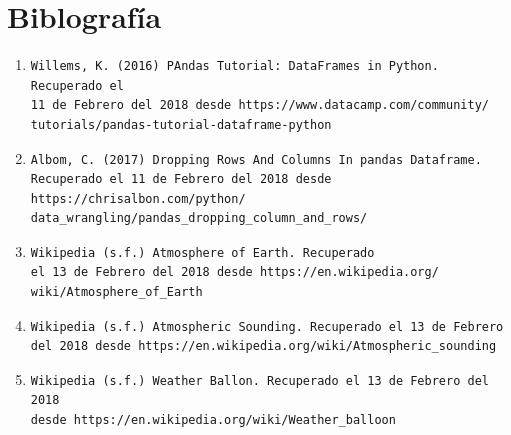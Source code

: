 \documentclass[a4paper]{article}
\begin{document}
\section{Biblografía}
\begin{enumerate}
\item \begin{verbatim}
Willems, K. (2016) PAndas Tutorial: DataFrames in Python. Recuperado el
11 de Febrero del 2018 desde https://www.datacamp.com/community/
tutorials/pandas-tutorial-dataframe-python
\end{verbatim}
\item \begin{verbatim}
Albom, C. (2017) Dropping Rows And Columns In pandas Dataframe. 
Recuperado el 11 de Febrero del 2018 desde https://chrisalbon.com/python/
data_wrangling/pandas_dropping_column_and_rows/
\end{verbatim}
\item \begin{verbatim}
Wikipedia (s.f.) Atmosphere of Earth. Recuperado
el 13 de Febrero del 2018 desde https://en.wikipedia.org/
wiki/Atmosphere_of_Earth
\end{verbatim}
\item \begin{verbatim}
Wikipedia (s.f.) Atmospheric Sounding. Recuperado el 13 de Febrero
del 2018 desde https://en.wikipedia.org/wiki/Atmospheric_sounding
\end{verbatim}
\item \begin{verbatim}
Wikipedia (s.f.) Weather Ballon. Recuperado el 13 de Febrero del 2018
desde https://en.wikipedia.org/wiki/Weather_balloon
\end{verbatim}
\end{enumerate}
\end{document}
